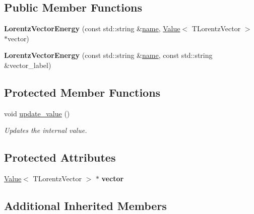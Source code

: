 \subsection*{Public Member Functions}
\begin{DoxyCompactItemize}
\item 
\hypertarget{classfv_1_1root_1_1LorentzVectorEnergy_acf4d9fce75b42083886346c4ec108fb4}{}\label{classfv_1_1root_1_1LorentzVectorEnergy_acf4d9fce75b42083886346c4ec108fb4} 
{\bfseries Lorentz\+Vector\+Energy} (const std\+::string \&\hyperlink{classfv_1_1GenValue_a610f89ee441eaad4c9e78f74d6bde93b}{name}, \hyperlink{classfv_1_1Value}{Value}$<$ T\+Lorentz\+Vector $>$ $\ast$vector)
\item 
\hypertarget{classfv_1_1root_1_1LorentzVectorEnergy_a1c6cbdf5623959f1c95ffbcd4d6b3259}{}\label{classfv_1_1root_1_1LorentzVectorEnergy_a1c6cbdf5623959f1c95ffbcd4d6b3259} 
{\bfseries Lorentz\+Vector\+Energy} (const std\+::string \&\hyperlink{classfv_1_1GenValue_a610f89ee441eaad4c9e78f74d6bde93b}{name}, const std\+::string \&vector\+\_\+label)
\end{DoxyCompactItemize}
\subsection*{Protected Member Functions}
\begin{DoxyCompactItemize}
\item 
void \hyperlink{classfv_1_1root_1_1LorentzVectorEnergy_aa69384d1af673c327daae869d5977981}{update\+\_\+value} ()
\begin{DoxyCompactList}\small\item\em Updates the internal value. \end{DoxyCompactList}\end{DoxyCompactItemize}
\subsection*{Protected Attributes}
\begin{DoxyCompactItemize}
\item 
\hypertarget{classfv_1_1root_1_1LorentzVectorEnergy_a96d17405d8e1cca75d81d2a9eefd101e}{}\label{classfv_1_1root_1_1LorentzVectorEnergy_a96d17405d8e1cca75d81d2a9eefd101e} 
\hyperlink{classfv_1_1Value}{Value}$<$ T\+Lorentz\+Vector $>$ $\ast$ {\bfseries vector}
\end{DoxyCompactItemize}
\subsection*{Additional Inherited Members}


